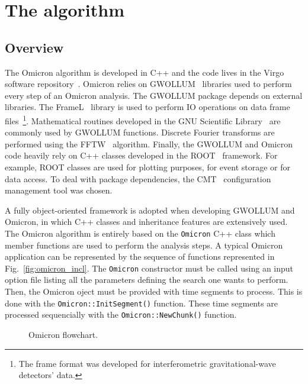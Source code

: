 \section{The algorithm} \label{sec:algorithm}

\subsection{Overview} \label{sec:algorithm:overview}
The Omicron algorithm is developed in C++ and the code lives in the Virgo software repository~\cite{VirgoSVN}. Omicron relies on GWOLLUM~\cite{GWOLLUM} libraries used to perform every step of an Omicron analysis. The GWOLLUM package depends on external libraries. The FrameL~\cite{FrameL} library is used to perform IO operations on data frame files~\footnote{The frame format was developed for interferometric gravitational-wave detectors' data.}. Mathematical routines developed in the GNU Scientific Library~\cite{GSL} are commonly used by GWOLLUM functions. Discrete Fourier transforms are performed using the FFTW~\cite{FFTW} algorithm. Finally, the GWOLLUM and Omicron code heavily rely on C++ classes developed in the ROOT~\cite{Brun:1997pa} framework. For example, ROOT classes are used for plotting purposes, for event storage or for data access. To deal with package dependencies, the CMT~\cite{CMT} configuration management tool was chosen.

A fully object-oriented framework is adopted when developing GWOLLUM and Omicron, in which C++ classes and inheritance features are extensively used. The Omicron algorithm is entirely based on the \texttt{Omicron} C++ class which member functions are used to perform the analysis steps. A typical Omicron application can be represented by the sequence of functions represented in Fig.~\ref{fig:omicron_incl}. The \texttt{Omicron} constructor must be called using an input option file listing all the parameters defining the search one wants to perform. Then, the Omicron oject must be provided with time segments to process. This is done with the \texttt{Omicron::InitSegment()} function. These time segments are processed sequencially with the \texttt{Omicron::NewChunk()} function.



\begin{figure}
  \center
  \caption{Omicron flowchart.}
  \label{fig:omicron_flowchart}
\end{figure}

